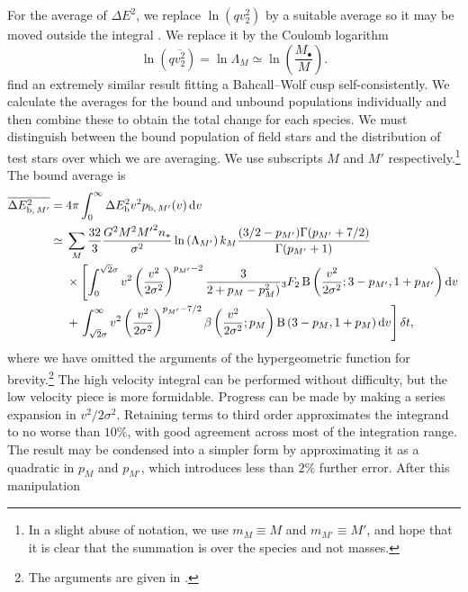 For the average of $\Delta E^2$, we replace $\ln\left(qv_2^2\right)$ by a suitable average so it may be moved outside the integral \citep[chapter 2]{Chandrasekhar1960}. We replace it by the Coulomb logarithm \citep{Bahcall1976}
\begin{equation}
\ln\left(q\overline{v_2^2}\right) = \ln \Lambda_M \simeq \ln\left(\dfrac{M_\bullet}{M}\right).
\end{equation}
\citet{Just2011} find an extremely similar result fitting a Bahcall--Wolf cusp self-consistently. We calculate the averages for the bound and unbound populations individually and then combine these to obtain the total change for each species. We must distinguish between the bound population of field stars and the distribution of test stars over which we are averaging. We use subscripts $M$ and $M'$ respectively.\footnote{In a slight abuse of notation, we use $m_M \equiv M$ and $m_{M'} \equiv M'$, and hope that it is clear that the summation is over the species and not masses.} The bound average is
\begin{align}
\overline{\Delta E^2_{\mathrm{b},\,M'}} = {} & 4\pi\intd{0}{\infty}{\Delta E^2\sub{b} v^2 p_{\mathrm{b},\,M'}(v)}{v} \\
 \simeq {} & \sum_M\dfrac{32}{3}\dfrac{G^2M^2{M'}^2n_\ast}{\sigma^2}\ln\left(\Lambda_{M'}\right) k_M \dfrac{(3/2 - p_{M'})\Gamma(p_{M'} + 7/2)}{\Gamma(p_{M'} + 1)} \nonumber \\* 
 {} & \times \left[ \intd{0}{\sqrt{2}\sigma}{v^2\left(\dfrac{v^2}{2\sigma^2}\right)^{p_{M'}-2} \dfrac{3}{2 + p_M - p_M^2)} {_3F_2}%
 \Beta\left(\dfrac{v^2}{2\sigma^2};3-p_{M'},1+p_{M'}\right)}{v} \right. \nonumber \\* 
 {} & + \left. \intd{\sqrt{2}\sigma}{\infty}{v^2\left(\dfrac{v^2}{2\sigma^2}\right)^{p_{M'}-7/2} \beta\left(\dfrac{v^2}{2\sigma^2};p_M\right) \Beta\left(3-p_M,1+p_M\right)}{v} \right] \delta t,
\end{align}
where we have omitted the arguments of the hypergeometric function for brevity.\footnote{The arguments are given in .} The high velocity integral can be performed without difficulty, but the low velocity piece is more formidable. Progress can be made by making a series expansion in $v^2/2\sigma^2$. Retaining terms to third order approximates the integrand to no worse than $10\%$, with good agreement across most of the integration range. The result may be condensed into a simpler form by approximating it as a quadratic in $p_M$ and $p_{M'}$, which introduces less than $2\%$ further error. After this manipulation
